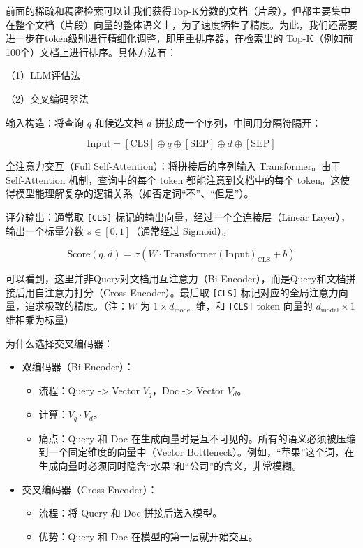 前面的稀疏和稠密检索可以让我们获得Top-K分数的文档（片段），但都主要集中在整个文档（片段）向量的整体语义上，为了速度牺牲了精度。为此，我们还需要进一步在token级别进行精细化调整，即用重排序器，在检索出的 Top-K（例如前100个）文档上进行排序。具体方法有：

（1）LLM评估法

（2）交叉编码器法

输入构造：将查询 \(q\) 和候选文档 \(d\) 拼接成一个序列，中间用分隔符隔开：

\[
\mathrm{Input}=[\mathrm{CLS}]\oplus q\oplus[\mathrm{SEP}]\oplus d\oplus[\mathrm{SEP}]
\]

全注意力交互（Full Self-Attention）：将拼接后的序列输入 Transformer。由于 Self-Attention 机制，查询中的每个 token 都能注意到文档中的每个 token。这使得模型能理解复杂的逻辑关系（如否定词``不''、``但是''）。

评分输出：通常取 \texttt{{[}CLS{]}} 标记的输出向量，经过一个全连接层（Linear Layer），输出一个标量分数 \(s\in[0,1]\)（通常经过 Sigmoid）。

\[
\mathrm{Score}(q,d)=\sigma(W\cdot \mathrm{Transformer}(\mathrm{Input})_{\mathrm{CLS}}+b)
\]

可以看到，这里并非Query对文档用互注意力（Bi-Encoder），而是Query和文档拼接后用自注意力打分（Cross-Encoder）。最后取 \texttt{{[}CLS{]}} 标记对应的全局注意力向量，追求极致的精度。（注：\(W\) 为 \(1\times d_{\mathrm{model}}\) 维，和 \texttt{{[}CLS{]}} token 向量的 \(d_{\mathrm{model}}\times 1\) 维相乘为标量）

为什么选择交叉编码器：

\begin{itemize}
\tightlist
\item
  双编码器（Bi-Encoder）：

  \begin{itemize}
  \tightlist
  \item
    流程：Query -\textgreater{} Vector \(V_q\)，Doc -\textgreater{} Vector \(V_d\)。
  \item
    计算：\(V_q \cdot V_d\)。
  \item
    痛点：Query 和 Doc 在生成向量时是互不可见的。所有的语义必须被压缩到一个固定维度的向量中（Vector Bottleneck）。例如，``苹果''这个词，在生成向量时必须同时隐含``水果''和``公司''的含义，非常模糊。
  \end{itemize}
\item
  交叉编码器（Cross-Encoder）：

  \begin{itemize}
  \tightlist
  \item
    流程：将 Query 和 Doc 拼接后送入模型。
  \item
    优势：Query 和 Doc 在模型的第一层就开始交互。
  \end{itemize}
\end{itemize}

